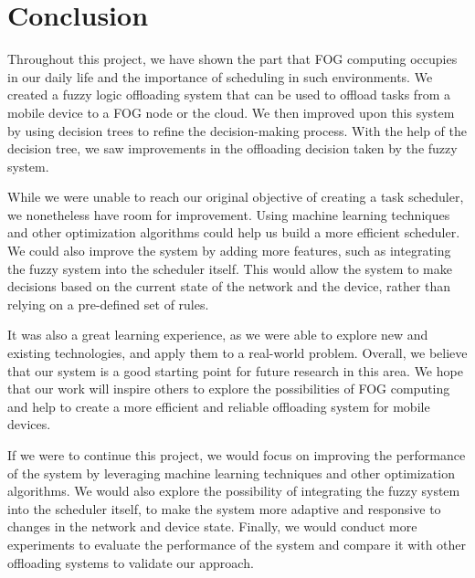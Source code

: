 \chapter{Conclusion}
\label{chap:conclusion}

Throughout this project, we have shown the part that FOG computing occupies in our daily life and the importance
of scheduling in such environments. We created a fuzzy logic offloading system that can be used to offload tasks
from a mobile device to a FOG node or the cloud. We then improved upon this system by using decision trees to
refine the decision-making process. With the help of the decision tree, we saw improvements in the offloading
decision taken by the fuzzy system.

While we were unable to reach our original objective of creating a task scheduler, we nonetheless have room for
improvement. Using machine learning techniques and other optimization algorithms could help us build a more
efficient scheduler. We could also improve the system by adding more features, such as integrating the fuzzy
system into the scheduler itself. This would allow the system to make decisions based on the current state of the
network and the device, rather than relying on a pre-defined set of rules.

It was also a great learning experience, as we were able to explore new and existing technologies, and apply them
to a real-world problem. Overall, we believe that our system is a good starting point for future research in this
area. We hope that our work will inspire others to explore the possibilities of FOG computing and help to create
a more efficient and reliable offloading system for mobile devices.

If we were to continue this project, we would focus on improving the performance of the system by leveraging
machine learning techniques and other optimization algorithms. We would also explore the possibility of integrating
the fuzzy system into the scheduler itself, to make the system more adaptive and responsive to changes in the
network and device state. Finally, we would conduct more experiments to evaluate the performance of the system
and compare it with other offloading systems to validate our approach.